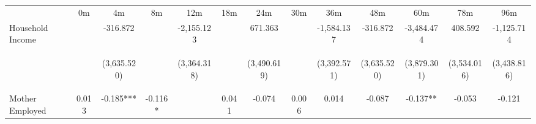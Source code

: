 \begin{tabular}{lcccccccccccc}
\hline \noalign{\smallskip} & 0m & 4m & 8m & 12m & 18m & 24m & 30m & 36m & 48m & 60m & 78m & 96m\\
\noalign{\smallskip}\hline \noalign{\smallskip}Household Income &  & -316.872 &  & -2,155.123 &  & 671.363 &  & -1,584.137 & -316.872 & -3,484.474 & 408.592 & -1,125.714\\
 & \begin{footnotesize}\end{footnotesize} & \begin{footnotesize}(3,635.520)\end{footnotesize} & \begin{footnotesize}\end{footnotesize} & \begin{footnotesize}(3,364.318)\end{footnotesize} & \begin{footnotesize}\end{footnotesize} & \begin{footnotesize}(3,490.619)\end{footnotesize} & \begin{footnotesize}\end{footnotesize} & \begin{footnotesize}(3,392.571)\end{footnotesize} & \begin{footnotesize}(3,635.520)\end{footnotesize} & \begin{footnotesize}(3,879.301)\end{footnotesize} & \begin{footnotesize}(3,534.016)\end{footnotesize} & \begin{footnotesize}(3,438.816)\end{footnotesize}\\
\noalign{\smallskip}Mother Employed & 0.013 & -0.185*** & -0.116* &  & 0.041 & -0.074 & 0.006 & 0.014 & -0.087 & -0.137** & -0.053 & -0.121\\

\end{tabular}
